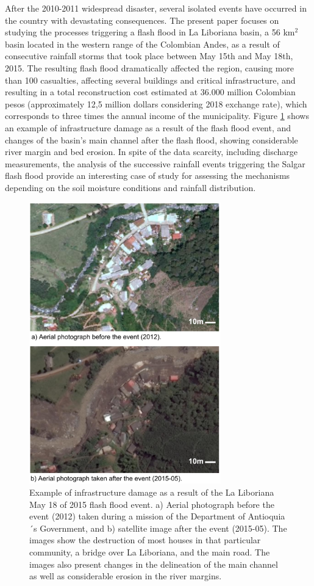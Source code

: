 \documentclass[hess, manuscript]{copernicus}
\begin{document}
After the  2010-2011 widespread disaster, several isolated events have occurred in the country with devastating consequences. The present paper focuses on studying the processes triggering a flash flood in La Liboriana basin,  a 56 km$^2$  basin located in the western range of the Colombian Andes, as a result of consecutive rainfall storms that took place between May 15th and May 18th, 2015. The resulting flash flood dramatically affected the region, causing more than 100 casualties,   affecting several buildings and critical infrastructure, and resulting in a total reconstruction cost estimated at 36.000 million Colombian pesos (approximately 12,5 million dollars considering 2018 exchange rate), which corresponds to three times the annual income of the municipality.  Figure \ref{fig:Antes_y_Despues} shows an example of infrastructure damage as a result of the flash flood event, and changes of the basin's main channel after the flash flood, showing considerable river margin and bed erosion. In spite of the data scarcity, including discharge measurements, the analysis of the successive rainfall events triggering the Salgar flash flood  provide an interesting case of study for assessing the mechanisms depending on the soil moisture conditions and rainfall distribution.\\


\begin{figure}[t]
    \centering
    \includegraphics[width=8.3cm]{Figures/Salgar_Before_After.png}
    \caption{Example of infrastructure damage as a result of the La Liboriana May 18 of 2015 flash flood event. a) Aerial photograph before the event (2012) taken during a mission of the Department of Antioquia´s Government, and b) satellite image after the event (2015-05). The images show the destruction of most houses in that particular community, a bridge over La Liboriana, and the main road. The images also present changes in the delineation of the main channel as well as considerable erosion in the river margins.}
    \label{fig:Antes_y_Despues}
\end{figure}
\end{document}
